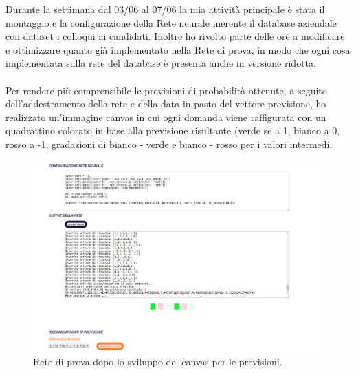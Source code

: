 Durante la settimana dal 03/06 al 07/06 la mia attivit\`a principale \`e stata il montaggio e la configurazione della Rete neurale inerente il database aziendale con dataset i colloqui ai candidati.
Inoltre ho rivolto parte delle ore a modificare e ottimizzare quanto gi\`a implementato nella Rete di prova, in modo che ogni cosa implementata sulla rete del database \`e presenta anche in versione ridotta.\\\\
Per rendere pi\`u comprensibile le previsioni di probabilit\`a ottenute, a seguito dell'addestramento della rete e della data in pasto del vettore previsione, ho realizzato un'immagine canvas in cui ogni domanda viene raffigurata con un quadrattino colorato in base alla previsione risultante (verde se a 1, bianco a 0, rosso a -1, gradazioni di bianco - verde e bianco - rosso per i valori intermedi.
\begin{figure}[H]
\centering
	\includegraphics[width=0.90\linewidth]{./image/rete_prova-canvas.png}
	\caption{Rete di prova dopo lo sviluppo del canvas per le previsioni.}
	\label{Rete di prova dopo lo sviluppo del canvas per le previsioni.}
\end{figure}


